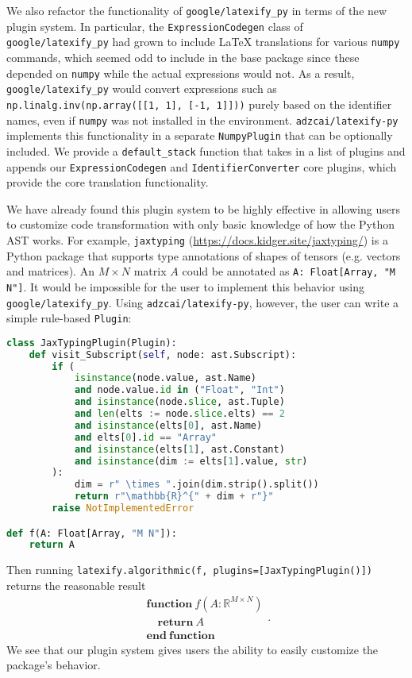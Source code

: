 \documentclass{article}
\newcommand{\ourpkg}{\texttt{adzcai/latexify-py}}
\newcommand{\theirpkg}{\texttt{google/latexify\_py}}
\begin{document}
We also refactor the functionality of \theirpkg{} in terms of the new plugin system.
In particular, the \verb|ExpressionCodegen| class of \theirpkg{} had grown to include \LaTeX{} translations for various \verb|numpy| commands,
which seemed odd to include in the base package since these depended on \verb|numpy| while the actual expressions would not.
As a result, \theirpkg{} would convert expressions such as \verb|np.linalg.inv(np.array([[1, 1], [-1, 1]]))| purely based on the identifier names,
even if \verb|numpy| was not installed in the environment.
\ourpkg{} implements this functionality in a separate \verb|NumpyPlugin| that can be optionally included.
We provide a \verb|default_stack| function that takes in a list of plugins and appends our \verb|ExpressionCodegen| and \verb|IdentifierConverter| core plugins,
which provide the core translation functionality.

We have already found this plugin system to be highly effective in allowing users to customize code transformation
with only basic knowledge of how the Python AST works.
For example, \verb|jaxtyping| (\url{https://docs.kidger.site/jaxtyping/}) is a Python package that supports type annotations of shapes of tensors (e.g. vectors and matrices).
An \( M \times N \) matrix \(A\) could be annotated as \verb|A: Float[Array, "M N"]|.
It would be impossible for the user to implement this behavior using \theirpkg{}.
Using \ourpkg{}, however, the user can write a simple rule-based \verb|Plugin|:

\begin{lstlisting}[language=Python]
class JaxTypingPlugin(Plugin):
    def visit_Subscript(self, node: ast.Subscript):
        if (
            isinstance(node.value, ast.Name)
            and node.value.id in ("Float", "Int")
            and isinstance(node.slice, ast.Tuple)
            and len(elts := node.slice.elts) == 2
            and isinstance(elts[0], ast.Name)
            and elts[0].id == "Array"
            and isinstance(elts[1], ast.Constant)
            and isinstance(dim := elts[1].value, str)
        ):
            dim = r" \times ".join(dim.strip().split())
            return r"\mathbb{R}^{" + dim + r"}"
        raise NotImplementedError

def f(A: Float[Array, "M N"]):
    return A
\end{lstlisting}

Then running \verb|latexify.algorithmic(f, plugins=[JaxTypingPlugin()])| returns the reasonable result
\[
\begin{array}{l} \mathbf{function} \ f(A: \mathbb{R}^{M \times N}) \\ \hspace{1em} \mathbf{return} \ A \\ \mathbf{end \ function} \end{array}.
\]
We see that our plugin system gives users the ability to easily customize the package's behavior.
\end{document}
